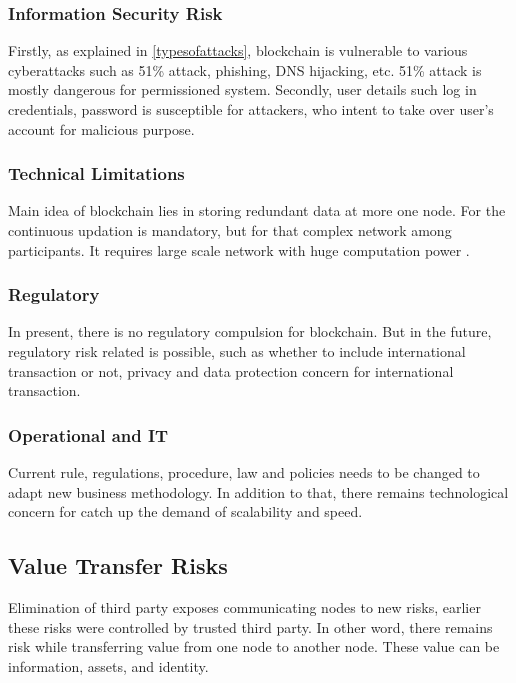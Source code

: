\documentclass[a4paper,twoside,12pt]{report}
\begin{document}
\begin{spacing}{1.5}
\subsubsection{Information Security Risk}
Firstly, as explained in \ref{typesofattacks}, blockchain is vulnerable to various cyberattacks such as 51\% attack, phishing, DNS hijacking, etc. 51\% attack is mostly dangerous for permissioned system. Secondly, user details such log in credentials, password is susceptible for attackers, who intent to take over user's account for malicious purpose. 	
\subsubsection{Technical Limitations}
Main idea of blockchain lies in storing redundant data at more one node. For the continuous updation is mandatory, but for that complex network among participants. It requires large scale network with huge computation power \cite{fangfangdai}.
\subsubsection{Regulatory}
In present, there is no regulatory compulsion for blockchain. But in the future, regulatory risk related is possible, such as whether to include international transaction or not, privacy and data protection concern for international transaction.    
\subsubsection{Operational and IT}
Current rule, regulations, procedure, law and policies needs to be changed to adapt new business methodology. In addition to that, there remains technological concern for catch up the demand of scalability and speed.   
\subsection{Value Transfer Risks}
Elimination of third party exposes communicating nodes to new risks, earlier these risks were controlled by trusted third party. In other word, there remains risk while transferring value from one node to another node. These value can be information, assets, and identity.

\end{spacing}
\end{document}
